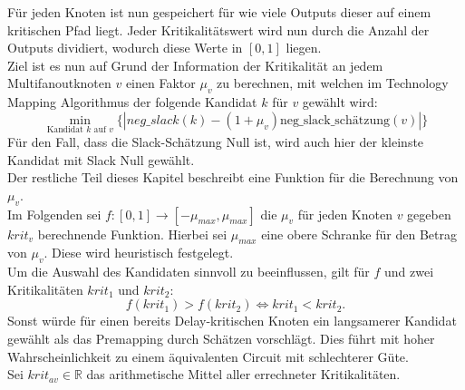 \documentclass[11pt, a4paper, german]{article}
\newcommand{\TM}{Technology  Mapping }
\begin{document}
Für jeden Knoten ist nun gespeichert für wie viele Outputs dieser auf einem kritischen Pfad liegt. Jeder Kritikalitätswert wird nun durch die Anzahl der Outputs dividiert, wodurch diese Werte in $[0,1]$ liegen.\\

Ziel ist es nun auf Grund der Information der Kritikalität an jedem Multifanoutknoten $v$ einen Faktor $\mu_v$ zu berechnen, mit welchen im \TM Algorithmus der folgende Kandidat $k$ für $v$  gewählt wird: 
\[\min\limits_{\text{Kandidat }k\text{ auf }v}\{|neg\_slack(k)-(1+\mu_v)\text{neg\_slack\_sch\"atzung}(v)|\}\]
Für den Fall, dass die Slack-Schätzung Null ist, wird auch hier der kleinste Kandidat mit Slack Null gewählt.\\

Der restliche Teil dieses Kapitel beschreibt eine Funktion für die Berechnung von $\mu_v$.\\
Im Folgenden sei $f: [0,1] \rightarrow[-\mu_{max}, \mu_{max}]$ die $\mu_v$ für jeden Knoten $v$ gegeben $krit_v$ berechnende Funktion. Hierbei sei  $\mu_{max}$ eine obere Schranke für den Betrag von $\mu_v$. Diese wird heuristisch festgelegt. \\
Um die Auswahl des Kandidaten sinnvoll zu beeinflussen, gilt für $f$ und zwei Kritikalitäten $krit_1$ und $krit_2$:
\[f(krit_1) > f(krit_2) \Leftrightarrow krit_1 < krit_2.\]
Sonst würde für einen bereits Delay-kritischen Knoten ein langsamerer Kandidat gewählt als das Premapping durch Schätzen vorschlägt. Dies führt mit hoher Wahrscheinlichkeit zu einem äquivalenten Circuit mit schlechterer Güte.\\
Sei $krit_{av} \in \mathbb{R}$ das arithmetische Mittel aller errechneter Kritikalitäten. \\
\end{document}
